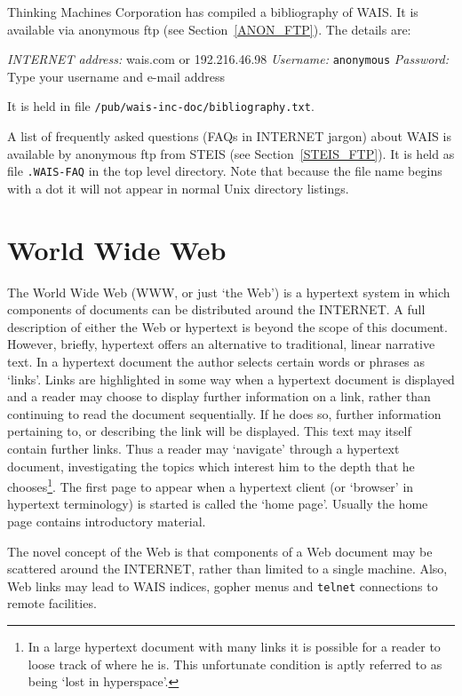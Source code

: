 \documentclass[twoside,11pt,nolof]{starlink}
\begin{document}
Thinking Machines Corporation has compiled a bibliography of WAIS.
It is available via anonymous ftp (see Section~\ref{ANON_FTP}). The
details are:

\textit{INTERNET address:} wais.com or 192.216.46.98
\newline \textit{Username:} \verb-anonymous-
\newline \textit{Password:} Type your username and e-mail address

It is held in file \texttt{/pub/wais-inc-doc/bibliography.txt}.

A list of frequently asked questions (FAQs in INTERNET jargon) about
WAIS is available by anonymous ftp from STEIS (see
Section~\ref{STEIS_FTP}). It is held as file \texttt{.WAIS-FAQ} in the
top level directory. Note that because the file name begins with a dot
it will not appear in normal Unix directory listings.


\section{World Wide Web
\label{WEB}}

The World Wide Web (WWW, or just `the Web') is a hypertext system in
which components of documents can be distributed around the INTERNET.
A full description of either the Web or hypertext is beyond the scope
of this document. However, briefly, hypertext offers an alternative to
traditional, linear narrative text. In a hypertext document the author
selects certain words or phrases as `links'. Links are highlighted in
some way when a hypertext document is displayed and a reader may choose
to display further information on a link, rather than continuing to
read the document sequentially. If he does so, further information
pertaining to, or describing the link will be displayed. This text may
itself contain further links. Thus a reader may `navigate' through a
hypertext document, investigating the topics which interest him to the
depth that he chooses\footnote{In a large hypertext document with many
links it is possible for a reader to loose track of where he is. This
unfortunate condition is aptly referred to as being `lost in
hyperspace'.}. The first page to appear when a hypertext client (or
`browser' in hypertext terminology) is started is called the `home
page'. Usually the home page contains introductory material.

The novel concept of the Web is that components of a Web
document may be scattered around the INTERNET, rather than limited to
a single machine. Also, Web links may lead to WAIS indices, gopher
menus and \texttt{telnet} connections to remote facilities.
\end{document}
